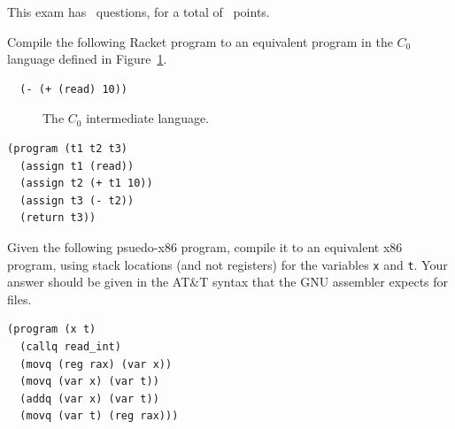 \documentclass[12pt,answers]{exam}
\newcommand{\itm}[1]{\ensuremath{\mathit{#1}}}
\newcommand{\key}[1]{\texttt{#1}}
\begin{document}
\vspace{20pt}

\begin{center} 
This exam has \numquestions\ questions, for a total of \numpoints\ 
points. 
\end{center} 

\begin{questions}


\question[14] Compile the following Racket program to an equivalent
program in the $C_0$ language defined in Figure~\ref{fig:c0-syntax}.
\begin{lstlisting}
  (- (+ (read) 10))
\end{lstlisting}

\begin{figure}[h]
\centering
\fbox{
\begin{minipage}{0.65\textwidth}
\[
\begin{array}{lcl}
\itm{arg} &::=& \itm{int} \mid \itm{var} \\
\itm{exp} &::=& \itm{arg} \mid (\key{read}) \mid (\key{-}\;\itm{arg}) \mid (\key{+} \; \itm{arg}\;\itm{arg})\\
\itm{stmt} &::=& (\key{assign}~\itm{var}~\itm{exp}) \mid (\key{return}~\itm{arg}) \\
C_0 & ::= & (\key{program}\;(\itm{var}^{*})\;\itm{stmt}^{+})
\end{array}
\]
\end{minipage}
}
\caption{The $C_0$ intermediate language.}
\label{fig:c0-syntax}
\end{figure}


\begin{solution}[1.5in]
\begin{lstlisting}
(program (t1 t2 t3)
  (assign t1 (read))
  (assign t2 (+ t1 10))
  (assign t3 (- t2))
  (return t3))
\end{lstlisting}
\end{solution}

\pagebreak

\question[15] Given the following psuedo-x86 program, compile it to an
equivalent x86 program, using stack locations (and not registers) for
the variables \texttt{x} and \texttt{t}. Your answer should be given
in the AT\&T syntax that the GNU assembler expects for \text{.s}
files.
\begin{lstlisting}
(program (x t)
  (callq read_int)
  (movq (reg rax) (var x))
  (movq (var x) (var t))
  (addq (var x) (var t))
  (movq (var t) (reg rax)))
\end{lstlisting}


\end{questions}
\end{document}
